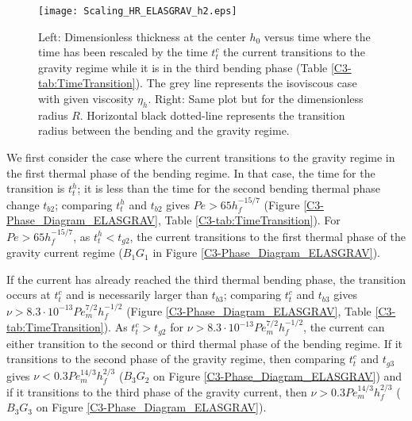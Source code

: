 \begin{figure}
  \begin{center}
    \graphicspath{ {/Users/thorey/Documents/These/Projet/Refroidissement/Skin_Model/Figure/JFM_V13/} }
    \texttt{[image: Scaling\_HR\_ELASGRAV\_h2.eps]}
    \caption{Left: Dimensionless thickness at  the center $h_0$ versus
      time where  the time has been  rescaled by the time  $t_t^c$ the
      current transitions  to the  gravity regime while  it is  in the
      third  bending phase  (Table \ref{C3-tab:TimeTransition}).   The
      grey line  represents the  isoviscous case with  given viscosity
      $\eta_h$.   Right: Same  plot but  for the  dimensionless radius
      $R$.   Horizontal black  dotted-line  represents the  transition
      radius between the bending and the gravity regime.}
    \label{C3-Scaling_HR_ELASGRAV_h2}
  \end{center}
\end{figure}

We  first consider  the  case  where the  current  transitions to  the
gravity regime  in the first thermal  phase of the bending  regime. In
that case, the time for the transition is $t_t^h$; it is less than the
time for the  second bending thermal phase  change $t_{b2}$; comparing
$t_t^h$    and   $t_{b2}$    gives    $Pe>65   h_f^{-15/7}$    (Figure
\ref{C3-Phase_Diagram_ELASGRAV},  Table  \ref{C3-tab:TimeTransition}).
For $Pe>65 h_f^{-15/7}$, as $t_t^h<t_{g2}$, the current transitions to
the first  thermal phase  of the gravity  current regime  ($B_1G_1$ in
Figure \ref{C3-Phase_Diagram_ELASGRAV}).

If the  current has already  reached the third thermal  bending phase,
the  transition  occurs at  $t_t^c$  and  is necessarily  larger  than
$t_{b3}$;      comparing      $t_t^c$     and      $t_{b3}$      gives
$\nu   >   8.3   \cdot   10^{-13}   Pe_m^{7/2}   h_f^{-1/2}$   (Figure
\ref{C3-Phase_Diagram_ELASGRAV},  Table  \ref{C3-tab:TimeTransition}).
As $t_t^c>t_{g2}$ for $\nu > 8.3\cdot 10^{-13} Pe_m^{7/2} h_f^{-1/2}$,
the current can either transition to the second or third thermal phase
of the bending  regime.  If it transitions to the  second phase of the
gravity   regime,   then   comparing  $t_t^c$   and   $t_{g3}$   gives
$\nu    <    0.3Pe_m^{14/3}    h_f^{2/3}$    ($B_3G_2$    on    Figure
\ref{C3-Phase_Diagram_ELASGRAV}) and  if it  transitions to  the third
phase of  the gravity current,  then $\nu >  0.3Pe_m^{14/3} h_f^{2/3}$
($B_3G_3$ on Figure \ref{C3-Phase_Diagram_ELASGRAV}).

